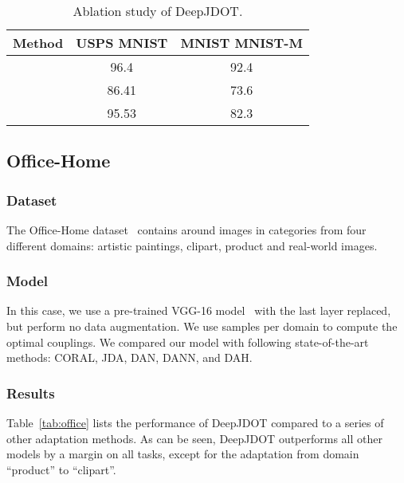 \documentclass[runningheads]{llncs}
\begin{document}
\begin{table}[t]
\centering
\caption{Ablation study of DeepJDOT.}
\begin{tabular}{c|c|c}
\hline
Method
  & USPS  MNIST &  MNIST  MNIST-M\\
\hline
& 96.4  & 92.4\\
  &86.41 &73.6\\
  & 95.53& 82.3\\\hline
\end{tabular}
\label{tab:ablation}
\end{table}








\subsection{Office-Home}\label{sec:officehome}

\subsubsection*{Dataset} The Office-Home dataset~\cite{venkateswara2017} contains around  images in  categories from four different domains: artistic paintings, clipart, product and real-world images.

\subsubsection*{Model} In this case, we use a pre-trained VGG-16 model~\cite{simonyan2014very} with the last layer replaced, but perform no data augmentation. We use  samples per domain to compute the optimal couplings. We compared our model with following state-of-the-art methods: CORAL\cite{Sun2016}, JDA\cite{Long2013}, DAN\cite{long15}, DANN\cite{Ganin2016}, and DAH\cite{venkateswara2017}.

\subsubsection*{Results}

Table~\ref{tab:office} lists the performance of DeepJDOT compared to a series of other adaptation methods. As can be seen, DeepJDOT outperforms all other models by a margin on all tasks, except for the adaptation from domain ``product'' to ``clipart''.
\end{document}
